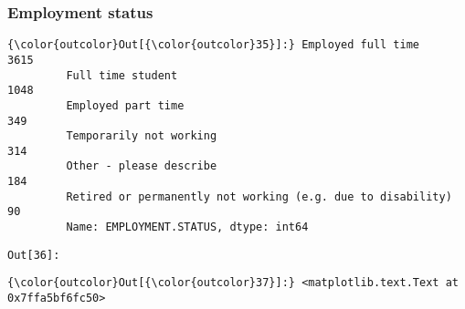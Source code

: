 \documentclass[11pt]{article}
\begin{document}
    \subsubsection{Employment status}\label{employment-status}


            \begin{Verbatim}[commandchars=\\\{\}]
{\color{outcolor}Out[{\color{outcolor}35}]:} Employed full time                                             3615
         Full time student                                              1048
         Employed part time                                              349
         Temporarily not working                                         314
         Other - please describe                                         184
         Retired or permanently not working (e.g. due to disability)      90
         Name: EMPLOYMENT.STATUS, dtype: int64
\end{Verbatim}
        
\texttt{\color{outcolor}Out[{\color{outcolor}36}]:}
    

    


            \begin{Verbatim}[commandchars=\\\{\}]
{\color{outcolor}Out[{\color{outcolor}37}]:} <matplotlib.text.Text at 0x7ffa5bf6fc50>
\end{Verbatim}
        
    \begin{center}
    \end{center}
    { \hspace*{\fill} \\}
    
\end{document}
